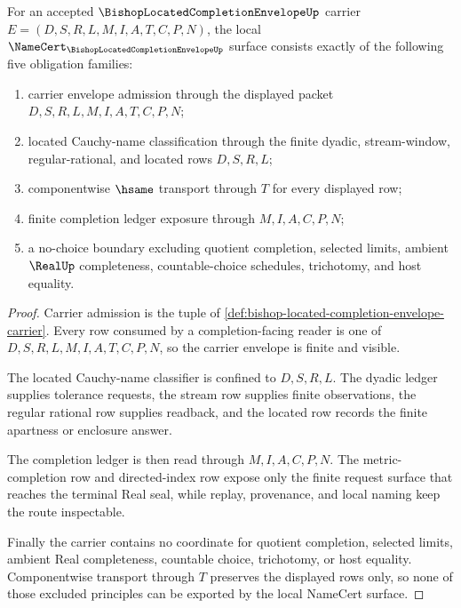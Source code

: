 \begin{theorem}
\label{thm:bishop-located-completion-envelope-namecert-obligations}
For an accepted $\BishopLocatedCompletionEnvelopeUp$ carrier $E=(D,S,R,L,M,I,A,T,C,P,N)$, the local $\NameCert_{\BishopLocatedCompletionEnvelopeUp}$ surface consists exactly of the following five obligation families:
\begin{enumerate}
\item carrier envelope admission through the displayed packet $D,S,R,L,M,I,A,T,C,P,N$;
\item located Cauchy-name classification through the finite dyadic, stream-window, regular-rational, and located rows $D,S,R,L$;
\item componentwise $\hsame$ transport through $T$ for every displayed row;
\item finite completion ledger exposure through $M,I,A,C,P,N$;
\item a no-choice boundary excluding quotient completion, selected limits, ambient $\RealUp$ completeness, countable-choice schedules, trichotomy, and host equality.
\end{enumerate}
\end{theorem}
\begin{proof}
Carrier admission is the tuple of \autoref{def:bishop-located-completion-envelope-carrier}. Every row consumed by a completion-facing reader is one of $D,S,R,L,M,I,A,T,C,P,N$, so the carrier envelope is finite and visible.

The located Cauchy-name classifier is confined to $D,S,R,L$. The dyadic ledger supplies tolerance requests, the stream row supplies finite observations, the regular rational row supplies readback, and the located row records the finite apartness or enclosure answer.

The completion ledger is then read through $M,I,A,C,P,N$. The metric-completion row and directed-index row expose only the finite request surface that reaches the terminal Real seal, while replay, provenance, and local naming keep the route inspectable.

Finally the carrier contains no coordinate for quotient completion, selected limits, ambient Real completeness, countable choice, trichotomy, or host equality. Componentwise transport through $T$ preserves the displayed rows only, so none of those excluded principles can be exported by the local NameCert surface.
\end{proof}

